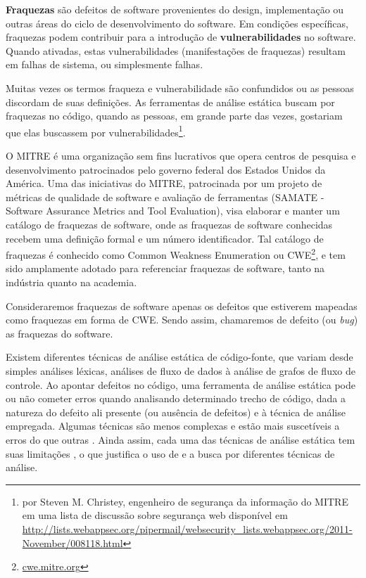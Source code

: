 \textbf{Fraquezas} são defeitos de software provenientes do design, implementação ou outras áreas do ciclo de desenvolvimento do software. Em condições específicas, fraquezas podem contribuir para a introdução de \textbf{vulnerabilidades} no software. Quando ativadas, estas vulnerabilidades (manifestações de fraquezas) resultam em falhas de sistema, ou simplesmente falhas.
\begin{citacao}
Muitas vezes os termos fraqueza e vulnerabilidade são confundidos ou as pessoas discordam de suas definições. As ferramentas de análise estática buscam por fraquezas no código, quando as pessoas, em grande parte das vezes, gostariam que elas buscassem por vulnerabilidades\footnote{por Steven M. Christey, engenheiro de segurança da informação do MITRE em uma lista de discussão sobre segurança web disponível em \url{http://lists.webappsec.org/pipermail/websecurity_lists.webappsec.org/2011-November/008118.html}}.
\end{citacao}

O MITRE é uma organização sem fins lucrativos que opera centros de pesquisa e desenvolvimento patrocinados pelo governo federal dos Estados Unidos da América. Uma das iniciativas do MITRE, patrocinada por um projeto de métricas de qualidade de software e avaliação de ferramentas (SAMATE - Software Assurance Metrics and Tool Evaluation), visa elaborar e manter um catálogo de fraquezas de software, onde as fraquezas de software conhecidas recebem uma definição formal e um número identificador. Tal catálogo de fraquezas é conhecido como Common Weakness Enumeration ou CWE\footnote{\url{cwe.mitre.org}}, e tem sido amplamente adotado para referenciar fraquezas de software, tanto na indústria quanto na academia.

Consideraremos fraquezas de software apenas os defeitos que estiverem mapeadas como fraquezas em forma de CWE. Sendo assim, chamaremos de defeito (ou \textit{bug}) as fraquezas do software.

Existem diferentes técnicas de análise estática de código-fonte, que variam desde simples análises léxicas, análises de fluxo de dados à análise de grafos de fluxo de controle. Ao apontar defeitos no código, uma ferramenta de análise estática pode ou não cometer erros quando analisando determinado trecho de código, dada a natureza do defeito ali presente (ou ausência de defeitos) e à técnica de análise empregada. Algumas técnicas são menos complexas e estão mais suscetíveis a erros do que outras \cite{harvard}. Ainda assim, cada uma das técnicas de análise estática tem suas limitações \cite{pascal}, o que justifica o uso de e a busca por diferentes técnicas de análise.

